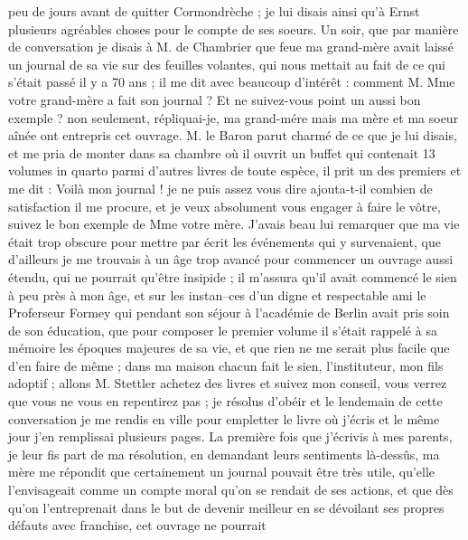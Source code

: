 \documentclass[12pt]{article}
\begin{document}
 peu de jours avant de quitter Cormondrèche ;
je lui disais ainsi qu’à Ernst plusieurs agréables choses pour le compte de ses soeurs. Un soir, que
par manière de conversation je disais à M. de Chambrier que feue ma grand-mère avait laissé un
journal de sa vie sur des feuilles volantes, qui nous mettait au fait de ce qui s’était passé il y a
70 ans ; il me dit avec beaucoup d’intérêt : comment M. Mme votre grand-mère a fait son journal ? Et
ne suivez-vous point un aussi bon exemple ? non seulement, répliquai-je, ma grand-mére mais ma mère
et ma soeur aînée ont entrepris cet ouvrage. M. le Baron parut charmé de ce que je lui disais, et me
pria de monter dans sa chambre où il ouvrit un buffet qui contenait 13 volumes in quarto parmi
d’autres livres de toute espèce, il prit un des premiers et me dit : Voilà mon journal ! je ne puis
assez vous dire ajouta-t-il combien de satisfaction il me procure, et je veux absolument vous
engager à faire le vôtre, suivez le bon exemple de Mme votre mère. J’avais beau lui remarquer que ma
vie était trop obscure pour mettre par écrit les événements qui y survenaient, que d’ailleurs je me
trouvais à un âge trop avancé pour commencer un ouvrage aussi étendu, qui ne pourrait qu’être
insipide ; il m’assura qu’il avait commencé le sien à peu près à mon âge, et sur les instan–ces d’un
digne et respectable ami le Proferseur Formey qui pendant son séjour à l’académie de Berlin avait
pris soin de son éducation, que pour composer le premier volume il s’était rappelé à sa mémoire les
époques majeures de sa vie, et que rien ne me serait plus facile que d’en faire de même ; dans ma
maison chacun fait le sien, l’instituteur, mon fils adoptif ; allons M. Stettler achetez des livres
et suivez mon conseil, vous verrez que vous ne vous en repentirez pas ; je résolus d’obéir et le
lendemain de cette conversation je me rendis en ville pour empletter le livre où j’écris et le même
jour j’en remplissai plusieurs pages. La première fois que j’écrivis à mes parents, je leur fis part
de ma résolution, en demandant leurs sentiments là-dessûs, ma mère me répondit que certainement un
journal pouvait être très utile, qu’elle l’envisageait comme un compte moral qu’on se rendait de ses
actions, et que dès qu’on l’entreprenait dans le but de devenir meilleur en se dévoilant ses propres
défauts avec franchise, cet ouvrage ne pourrait
\end{document}

